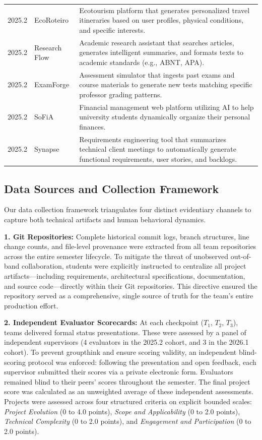 \documentclass[conference]{IEEEtran}
\begin{document}
\begin{table}[t]
\begin{tabular}{@{}lp{3cm}p{12.5cm}@{}}
2025.2 & EcoRoteiro & Ecotourism platform that generates personalized travel itineraries based on user profiles, physical conditions, and specific interests. \\
2025.2 & Research Flow & Academic research assistant that searches articles, generates intelligent summaries, and formats texts to academic standards (e.g., ABNT, APA). \\
2025.2 & ExamForge & Assessment simulator that ingests past exams and course materials to generate new tests matching specific professor grading patterns. \\
2025.2 & SoFiA & Financial management web platform utilizing AI to help university students dynamically organize their personal finances. \\
2025.2 & Synapse & Requirements engineering tool that summarizes technical client meetings to automatically generate functional requirements, user stories, and backlogs. \\
\bottomrule
\end{tabular}
\end{table}

\subsection{Data Sources and Collection Framework}
Our data collection framework triangulates four distinct evidentiary channels to capture both technical artifacts and human behavioral dynamics.

\textbf{1. Git Repositories:} Complete historical commit logs, branch structures, line change counts, and file-level provenance were extracted from all team repositories across the entire semester lifecycle. To mitigate the threat of unobserved out-of-band collaboration, students were explicitly instructed to centralize all project artifacts---including requirements, architectural specifications, documentation, and source code---directly within their Git repositories. This directive ensured the repository served as a comprehensive, single source of truth for the team's entire production effort.

\textbf{2. Independent Evaluator Scorecards:} At each checkpoint ($T_1$, $T_2$, $T_3$), teams delivered formal status presentations. These were assessed by a panel of independent supervisors (4 evaluators in the 2025.2 cohort, and 3 in the 2026.1 cohort). To prevent groupthink and ensure scoring validity, an independent blind-scoring protocol was enforced: following the presentation and open feedback, each supervisor submitted their scores via a private electronic form. Evaluators remained blind to their peers' scores throughout the semester. The final project score was calculated as an unweighted average of these independent assessments. Projects were assessed across four structured criteria on explicit bounded scales: \emph{Project Evolution} (0 to 4.0 points), \emph{Scope and Applicability} (0 to 2.0 points), \emph{Technical Complexity} (0 to 2.0 points), and \emph{Engagement and Participation} (0 to 2.0 points).
\end{document}
